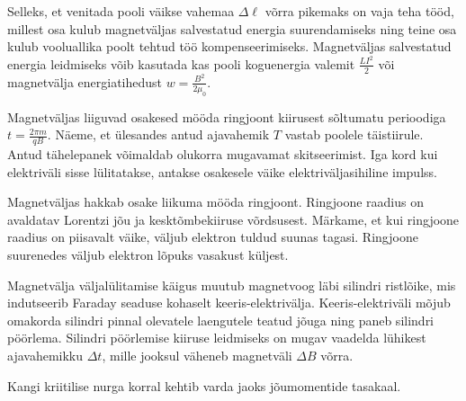 \documentclass[10pt]{article}
\begin{document}
{%

\hint
Selleks, et venitada pooli väikse vahemaa $\Delta \ell$ võrra pikemaks on vaja teha tööd, millest osa kulub magnetväljas salvestatud energia suurendamiseks ning teine osa kulub vooluallika poolt tehtud töö kompenseerimiseks. Magnetväljas salvestatud energia leidmiseks võib kasutada kas pooli koguenergia valemit $\frac{LI^2}{2}$ või magnetvälja energiatihedust $w = \frac{B^2}{2\mu_0}$.
\probend
\bigskip


\hint
Magnetväljas liiguvad osakesed mööda ringjoont kiirusest sõltumatu perioodiga $t = \frac{2\pi m}{qB}$. Näeme, et ülesandes antud ajavahemik $T$ vastab poolele täistiirule. Antud tähelepanek võimaldab olukorra mugavamat skitseerimist. Iga kord kui elektriväli sisse lülitatakse, antakse osakesele väike elektriväljasihiline impulss.
\probend
\bigskip


\hint
Magnetväljas hakkab osake liikuma mööda ringjoont. Ringjoone raadius on avaldatav Lorentzi jõu ja kesktõmbekiiruse võrdsusest.
Märkame, et kui ringjoone raadius on piisavalt väike, väljub elektron tuldud suunas tagasi. Ringjoone suurenedes väljub elektron lõpuks vasakust küljest.
\probend
\bigskip


\hint
Magnetvälja väljalülitamise käigus muutub magnetvoog läbi silindri ristlõike, mis indutseerib Faraday seaduse kohaselt keeris-elektrivälja. Keeris-elektriväli mõjub omakorda silindri pinnal olevatele laengutele teatud jõuga ning paneb silindri pöörlema. Silindri pöörlemise kiiruse leidmiseks on mugav vaadelda lühikest ajavahemikku $\Delta t$, mille jooksul väheneb magnetväli $\Delta B$ võrra.
\probend
\bigskip


\hint
Kangi kriitilise nurga korral kehtib varda jaoks jõumomentide tasakaal.
\probend
\bigskip

}
\end{document}
